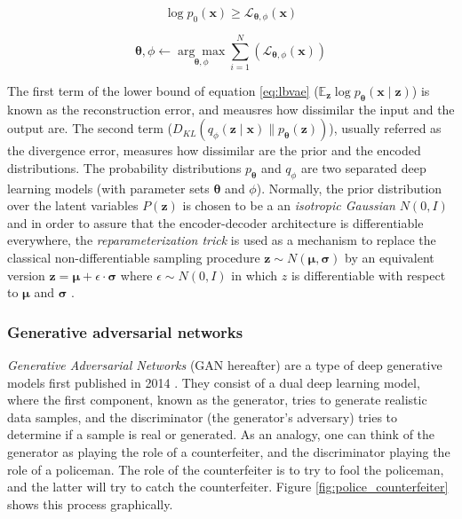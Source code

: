 \begin{equation}
\label{eq:vaelbasloss}
\log p_{0}(\mathbf{x}) \geq \mathcal{L}_{\mathbf{\theta}, \phi}\left(\mathbf{x}\right)
\end{equation}

\begin{equation}
\label{eq:vaeopt}
\mathbf{\theta}, \phi \leftarrow \underset{\mathbf{\theta}, \phi}{\arg \max } \sum_{i=1}^{N}\left(\mathcal{L}_{\mathbf{\theta}, \phi}(\mathbf{x})\right)
\end{equation}

The first term of the lower bound of equation \ref{eq:lbvae} ($\mathbb{E}_{\mathbf{z}} \log p_{\mathbf{\theta}}(\mathbf{x} \mid \mathbf{z})$) is known as the reconstruction error, and meausres how dissimilar the input and the output are. The second term ($D_{K L}\left(q_{\phi}(\mathbf{z} \mid \mathbf{x}) \| p_{\mathbf{\theta}}(\mathbf{z})\right)$), usually referred as the divergence error, measures how dissimilar are the prior and the encoded distributions. The probability distributions $p_\mathbf{\theta}$ and $q_\phi$ are two separated deep learning models (with parameter sets $\mathbf{\theta}$ and $\phi$). Normally, the prior distribution over the latent variables $P(\mathbf{z})$ is chosen to be a an \textit{isotropic Gaussian} $N(0,I)$ \autocite{wei2021} and in order to assure that the encoder-decoder architecture is differentiable everywhere, the \textit{reparameterization trick} is used as a mechanism to replace the classical non-differentiable sampling procedure $\mathbf{z} \sim N(\mathbf{\mu}, \mathbf{\sigma})$ by an equivalent version $\mathbf{z} = \mathbf{\mu} + \epsilon \cdot \mathbf{\sigma}$ where $\epsilon \sim N(0,I)$ in which $z$ is differentiable with respect to $\mathbf{\mu}$ and $\mathbf{\sigma}$ \autocite{kingma2019}.


\subsubsection{Generative adversarial networks}
\textit{Generative Adversarial Networks} (GAN hereafter) are a type of deep generative models first published in 2014 \autocite{Goodfellow2014}. They consist of a dual deep learning model, where the first component, known as the generator, tries to generate realistic data samples, and the discriminator (the generator's adversary) tries to determine if a sample is real or generated. As an analogy, one can think of the generator as playing the role of a counterfeiter, and the discriminator playing the role of a policeman. The role of the counterfeiter is to try to fool the policeman, and the latter will try to catch the counterfeiter. Figure \ref{fig:police_counterfeiter} shows this process graphically.

